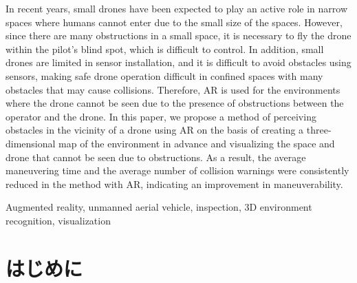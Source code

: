 \documentclass[submit,techrep]{ipsj}
\begin{document}
\begin{eabstract}

In recent years, small drones have been expected to play an active role in narrow spaces where humans cannot enter due to the small size of the spaces. However, since there are many obstructions in a small space, it is necessary to fly the drone within the pilot's blind spot, which is difficult to control. In addition, small drones are limited in sensor installation, and it is difficult to avoid obstacles using sensors, making safe drone operation difficult in confined spaces with many obstacles that may cause collisions. Therefore, AR is used for the environments where the drone cannot be seen due to the presence of obstructions between the operator and the drone. In this paper, we propose a method of perceiving obstacles in the vicinity of a drone using AR on the basis of creating a three-dimensional map of the environment in advance and visualizing the space and drone that cannot be seen due to obstructions. As a result, the average maneuvering time and the average number of collision warnings were consistently reduced in the method with AR, indicating an improvement in maneuverability.

\end{eabstract}

\begin{ekeyword}
Augmented reality, unmanned aerial vehicle, inspection, 3D environment recognition, visualization
\end{ekeyword}

\maketitle

\section{はじめに}
\end{document}

